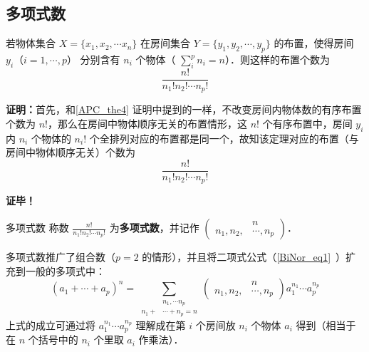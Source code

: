 \subsection{多项式数}
\begin{theorem}{}
若物体集合 $X=\{x_1,x_2,\cdots x_n\}$ 在房间集合 $Y=\{y_1,y_2,\cdots,y_p\}$ 的布置，使得房间 $y_i$（$i=1,\cdots,p$） 分别含有 $n_i$ 个物体（ $\sum_{i}^p n_i=n$）．则这样的布置个数为
\begin{equation}
\frac{n!}{n_1!n_2!\cdots n_p!}
\end{equation}
 
\end{theorem}
\textbf{证明：}首先，和\autoref{APC_the4} 证明中提到的一样，不改变房间内物体数的有序布置个数为 $n!$，那么在房间中物体顺序无关的布置情形，这 $n!$ 个有序布置中，房间 $y_i$ 内 $n_i$ 个物体的 $n_i !$ 个全排列对应的布置都是同一个，故知该定理对应的布置（与房间中物体顺序无关）个数为
\begin{equation}
\frac{n!}{n_1!n_2!\cdots n_p!}
\end{equation}

\textbf{证毕！}

\begin{definition}{多项式数}
称数 $\frac{n!}{n_1!n_2!\cdots n_p!}$ 为\textbf{多项式数}，并记作 $\left(\begin{aligned}
&n\\n_1,n_2,&\cdots,n_p
\end{aligned}\right)$．
\end{definition}

多项式数推广了组合数（$p=2$ 的情形），并且将二项式公式（\autoref{BiNor_eq1}~）扩充到一般的多项式中：
\begin{equation}
(a_1+\cdots+a_p)^n=\sum_{\begin{aligned}
&n_1,\cdots n_p\\
n_1+&\cdots+n_p=n
\end{aligned}}\left(\begin{aligned}
&n\\n_1,n_2,&\cdots,n_p
\end{aligned}\right)a_1^{n_1}\cdots a_p^{n_p}
\end{equation}
上式的成立可通过将 $a_1^{n_1}\cdots a_p^{n_p}$ 理解成在第 $i$ 个房间放 $n_i$ 个物体 $a_i$ 得到（相当于在 $n$ 个括号中的 $n_i$ 个里取 $a_i$ 作乘法）．